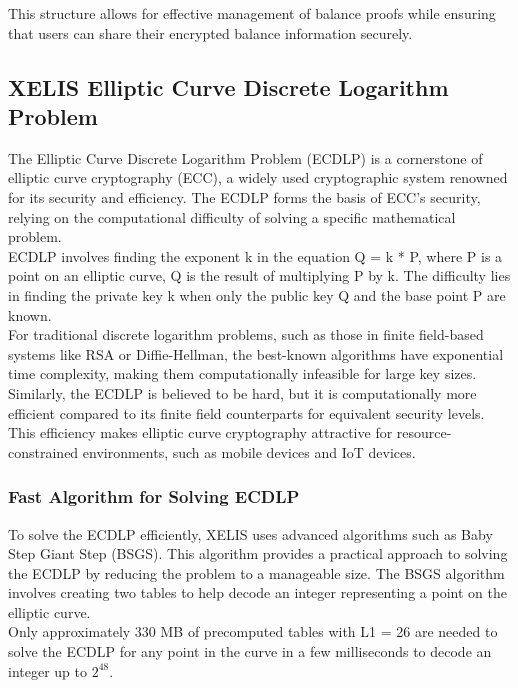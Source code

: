 \documentclass[10pt,a4paper,twocolumn]{article}
\begin{document}
This structure allows for effective management of balance proofs while ensuring that users can share their encrypted balance information securely.

\subsection{XELIS Elliptic Curve Discrete Logarithm Problem}

The Elliptic Curve Discrete Logarithm Problem (ECDLP) is a cornerstone of elliptic curve cryptography (ECC), a widely used cryptographic system renowned for its security and efficiency. The ECDLP forms the basis of ECC's security, relying on the computational difficulty of solving a specific mathematical problem.\\

ECDLP involves finding the exponent k in the equation Q = k * P, where P is a point on an elliptic curve, Q is the result of multiplying P by k. The difficulty lies in finding the private key k when only the public key Q and the base point P are known.\\

For traditional discrete logarithm problems, such as those in finite field-based systems like RSA or Diffie-Hellman, the best-known algorithms have exponential time complexity, making them computationally infeasible for large key sizes. Similarly, the ECDLP is believed to be hard, but it is computationally more efficient compared to its finite field counterparts for equivalent security levels. This efficiency makes elliptic curve cryptography attractive for resource-constrained environments, such as mobile devices and IoT devices.\\

\subsubsection{Fast Algorithm for Solving ECDLP}

To solve the ECDLP efficiently, XELIS uses advanced algorithms such as Baby Step Giant Step (BSGS). This algorithm provides a practical approach to solving the ECDLP by reducing the problem to a manageable size. The BSGS algorithm involves creating two tables to help decode an integer representing a point on the elliptic curve. \\

Only approximately 330 MB of precomputed tables with L1 = 26 are needed to solve the ECDLP for any point in the curve in a few milliseconds to decode an integer up to \(2^{48}\).\\
\end{document}
